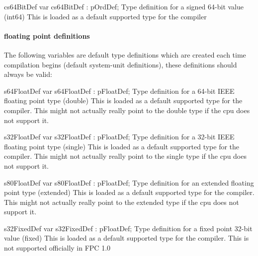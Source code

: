 \documentclass [12pt]{article}
\begin{document}
\begin{variable}{cs64BitDef}
\Declaration
var cs64BitDef : pOrdDef;
\Description
Type definition for a signed 64-bit value (\textsf{int64})
\Notes
This is loaded as a default supported type for the compiler
\end{variable}

\paragraph{floating point definitions}

The following variables are default type definitions which are created each
time compilation begins (default system-unit definitions), these definitions
should always be valid:

\begin{variable}{s64FloatDef} 
\Declaration
var s64FloatDef : pFloatDef; 
\Description 
Type definition for a 64-bit IEEE floating point type (\textsf{double})
\Notes 
This is loaded as a default supported type for the compiler. This might not
actually really point to the double type if the cpu does not support it.
\end{variable}

\begin{variable}{s32FloatDef} 
\Declaration
var s32FloatDef : pFloatDef; 
\Description 
Type definition for a 32-bit IEEE floating point type (\textsf{single})
\Notes
This is loaded as a default supported type for the compiler. This might not
actually really point to the single type if the cpu does not support it.
\end{variable}

\begin{variable}{s80FloatDef}
\Declaration 
var s80FloatDef : pFloatDef; 
\Description 
Type definition for an extended floating point type (\textsf{extended})
\Notes 
This is loaded as a default supported type for the compiler. This
might not actually really point to the extended type if the cpu does not
support it.
\end{variable}

\begin{variable}{s32FixedDef}
\Declaration 
var s32FixedDef : pFloatDef; 
\Description 
Type definition for a fixed point 32-bit value (\textsf{fixed})
\Notes 
This is loaded as a default supported type for the compiler. This is
not supported officially in FPC 1.0
\end{variable}

\clearpage 
\end{document}
